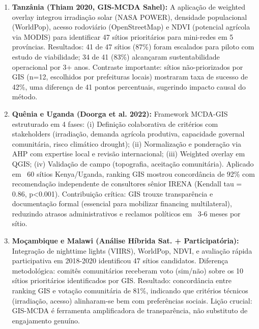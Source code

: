 \documentclass[12pt, a4paper]{article}
\begin{document}
\begin{enumerate}
  \item \textbf{Tanzânia (Thiam 2020, GIS-MCDA Sahel):} A aplicação de weighted overlay integrou irradiação solar (NASA POWER), densidade populacional (WorldPop), acesso rodoviário (OpenStreetMap) e NDVI (potencial agrícola via MODIS) para identificar 47 sítios prioritários para mini-redes em 5 províncias. Resultados: 41 de 47 sítios (87\%) foram escalados para piloto com estudo de viabilidade; 34 de 41 (83\%) alcançaram sustentabilidade operacional por 3+ anos. Contraste importante: sítios não-priorizados por GIS (n=12, escolhidos por prefeituras locais) mostraram taxa de sucesso de 42\%, uma diferença de 41 pontos percentuais, sugerindo impacto causal do método.

  \item \textbf{Quênia e Uganda (Doorga et al. 2022):} Framework MCDA-GIS estruturado em 4 fases: (i) Definição colaborativa de critérios com stakeholders (irradiação, demanda agrícola produtiva, capacidade governal comunitária, risco climático drought); (ii) Normalização e ponderação via AHP com expertise local e revisão internacional; (iii) Weighted overlay em QGIS; (iv) Validação de campo (topografia, aceitação comunitária). Aplicado em ~60 sítios Kenya/Uganda, ranking GIS mostrou concordância de 92\% com recomendação independente de consultores sênior IRENA (Kendall tau = 0.86, p<0.001). Contribuição crítica: GIS trouxe transparência e documentação formal (essencial para mobilizar financing multilateral), reduzindo atrasos administrativos e reclamos políticos em ~3-6 meses por sítio.

  \item \textbf{Moçambique e Malawi (Análise Híbrida Sat. + Participatória):} Integração de nighttime lights (VIIRS), WorldPop, NDVI, e avaliação rápida participativa em 2018-2020 identificou 47 sítios candidatos. Diferença metodológica: comitês comunitários receberam voto (sim/não) sobre os 10 sítios prioritários identificados por GIS. Resultado: concordância entre ranking GIS e votação comunitária de 81\%, indicando que critérios técnicos (irradiação, acesso) alinharam-se bem com preferências sociais. Lição crucial: GIS-MCDA é ferramenta amplificadora de transparência, não substituto de engajamento genuíno.
\end{enumerate}
\end{document}
